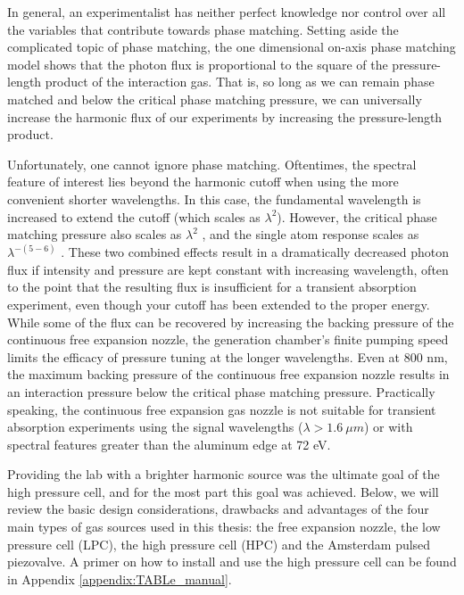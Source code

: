 In general, an experimentalist has neither perfect knowledge nor control over all the variables that contribute towards phase matching. Setting aside the complicated topic of phase matching, the one dimensional on-axis phase matching model\cite{constantOptimizingHighHarmonic1999} shows that the photon flux is proportional to the square of the pressure-length product of the interaction gas. That is, so long as we can remain phase matched and below the critical phase matching pressure\cite{popmintchevPhaseMatchingHigh2009}, we can universally increase the harmonic flux of our experiments by increasing the pressure-length product.

Unfortunately, one cannot ignore phase matching. Oftentimes, the spectral feature of interest lies beyond the harmonic cutoff when using the more convenient shorter wavelengths. In this case, the fundamental wavelength is increased to extend the cutoff (which scales as $\lambda^2$). However, the critical phase matching pressure also scales as $\lambda^2$ \cite{popmintchevPhaseMatchingHigh2009}, and the single atom response scales as $\lambda^{-(5-6)}$ \cite{tateScalingWavePacketDynamics2007}. These two combined effects result in a dramatically decreased photon flux if intensity and pressure are kept constant with increasing wavelength, often to the point that the resulting flux is insufficient for a transient absorption experiment, even though your cutoff has been extended to the proper energy. While some of the flux can be recovered by increasing the backing pressure of the continuous free expansion nozzle, the generation chamber's finite pumping speed limits the efficacy of pressure tuning at the longer wavelengths. Even at 800 nm, the maximum backing pressure of the continuous free expansion nozzle results in an interaction pressure below the critical phase matching pressure. Practically speaking, the continuous free expansion gas nozzle is not suitable for transient absorption experiments using the signal wavelengths ($\lambda > 1.6 \ \mu m$) or with spectral features greater than the aluminum edge at 72 eV.

Providing the lab with a brighter harmonic source was the ultimate goal of the high pressure cell, and for the most part this goal was achieved. Below, we will review the basic design considerations, drawbacks and advantages of the four main types of gas sources used in this thesis: the free expansion nozzle, the low pressure cell (LPC), the high pressure cell (HPC) and the Amsterdam pulsed piezovalve. A primer on how to install and use the high pressure cell can be found in Appendix \ref{appendix:TABLe_manual}.

